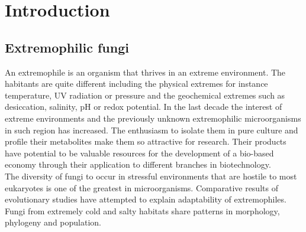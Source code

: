 \documentclass[12pt, a4paper]{report}
\begin{document}
\chapter*{Introduction} 
\section{Extremophilic fungi}
An extremophile is an organism that thrives in an extreme environment. The habitants are quite different including the physical extremes for instance temperature, UV radiation or pressure and the geochemical extremes such as desiccation, salinity, pH or redox potential. \cite{Rothschild2001} 
In the last decade the interest of extreme environments and the previously unknown extremophilic microorganisms in such region has increased. The enthusiasm to isolate them in pure culture and profile their metabolites make them so attractive for research. Their products have potential to be valuable resources for the development of a bio-based economy through their application to different branches in biotechnology. \cite{Raddadi2015} \\
The diversity of fungi to occur in stressful environments that are hostile to most eukaryotes is one of the greatest in microorganisms. Comparative results of evolutionary studies have attempted to explain adaptability of extremophiles. Fungi from extremely cold and salty habitats share patterns in morphology, phylogeny and population. \cite{Gostincar2010} 
\end{document}
